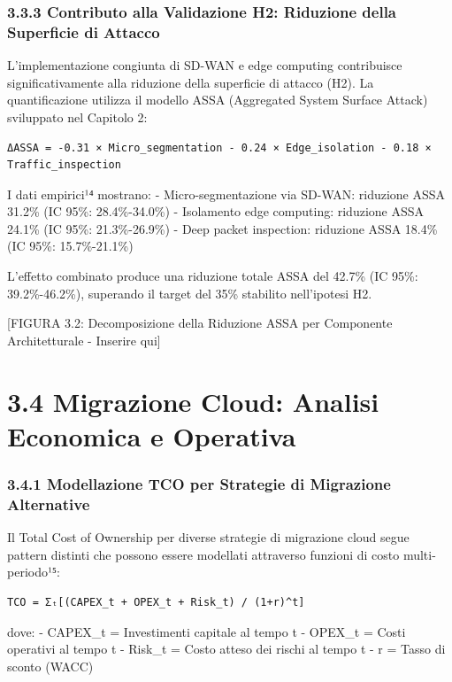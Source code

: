 \documentclass{report}
\begin{document}
\subsubsection{3.3.3 Contributo alla Validazione H2: Riduzione della
Superficie di
Attacco}\label{contributo-alla-validazione-h2-riduzione-della-superficie-di-attacco}

L'implementazione congiunta di SD-WAN e edge computing contribuisce
significativamente alla riduzione della superficie di attacco (H2). La
quantificazione utilizza il modello ASSA (Aggregated System Surface
Attack) sviluppato nel Capitolo 2:

\begin{verbatim}
ΔASSA = -0.31 × Micro_segmentation - 0.24 × Edge_isolation - 0.18 × Traffic_inspection
\end{verbatim}

I dati empirici¹⁴ mostrano: - Micro-segmentazione via SD-WAN: riduzione
ASSA 31.2\% (IC 95\%: 28.4\%-34.0\%) - Isolamento edge computing:
riduzione ASSA 24.1\% (IC 95\%: 21.3\%-26.9\%) - Deep packet inspection:
riduzione ASSA 18.4\% (IC 95\%: 15.7\%-21.1\%)

L'effetto combinato produce una riduzione totale ASSA del 42.7\% (IC
95\%: 39.2\%-46.2\%), superando il target del 35\% stabilito
nell'ipotesi H2.

{[}FIGURA 3.2: Decomposizione della Riduzione ASSA per Componente
Architetturale - Inserire qui{]}

\section{3.4 Migrazione Cloud: Analisi Economica e
Operativa}\label{migrazione-cloud-analisi-economica-e-operativa}

\subsubsection{3.4.1 Modellazione TCO per Strategie di Migrazione
Alternative}\label{modellazione-tco-per-strategie-di-migrazione-alternative}

Il Total Cost of Ownership per diverse strategie di migrazione cloud
segue pattern distinti che possono essere modellati attraverso funzioni
di costo multi-periodo¹⁵:

\begin{verbatim}
TCO = Σₜ[(CAPEX_t + OPEX_t + Risk_t) / (1+r)^t]
\end{verbatim}

dove: - CAPEX\_t = Investimenti capitale al tempo t - OPEX\_t = Costi
operativi al tempo t - Risk\_t = Costo atteso dei rischi al tempo t - r
= Tasso di sconto (WACC)
\end{document}
